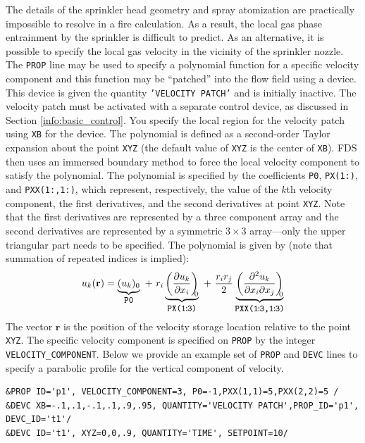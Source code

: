 \documentclass[11pt]{book}
\newcommand{\ct}{\tt\small}
\begin{document}
The details of the sprinkler head geometry and spray atomization are practically impossible to resolve in a fire calculation.  As a result, the local gas phase entrainment by the sprinkler is difficult to predict.  As an alternative, it is possible to specify the local gas velocity in the vicinity of the sprinkler nozzle.  The {\ct PROP} line may be used to specify a polynomial function for a specific velocity component and this function may be ``patched'' into the flow field using a device.  This device is given the quantity {\ct 'VELOCITY PATCH'} and is initially inactive.  The velocity patch must be activated with a separate control device, as discussed in Section \ref{info:basic_control}.  You specify the local region for the velocity patch using {\ct XB} for the device.  The polynomial is defined as a second-order Taylor expansion about the point {\ct XYZ} (the default value of {\ct XYZ} is the center of {\ct XB}).  FDS then uses an immersed boundary method to force the local velocity component to satisfy the polynomial.  The polynomial is specified by the coefficients {\ct P0}, {\ct PX(1\!:)}, and {\ct PXX(1\!:,1\!:)}, which represent, respectively, the value of the $k$th velocity component, the first derivatives, and the second derivatives at point {\ct XYZ}.  Note that the first derivatives are represented by a three component array and the second derivatives are represented by a symmetric $3 \times 3$ array---only the upper triangular part needs to be specified.  The polynomial is given by (note that summation of repeated indices is implied):
\begin{equation}
u_k(\mathbf{r}) = \underbrace{(u_k)_0}_{\mbox{\ct P0}} \,\,+\,\, r_i \underbrace{\left( \frac{\partial u_k}{\partial x_i} \right)_{\!\!\!0}}_{\mbox{\ct PX(1\!:\!3)}} \,\,+\,\,\frac{ r_i r_j}{2} \underbrace{\left(\frac{\partial^2 u_k}{\partial x_i \partial x_j}\right)_{\!\!\!0}}_{\mbox{\ct PXX(1\!:\!3,1\!:\!3)}}
\end{equation}
The vector $\mathbf{r}$ is the position of the velocity storage location relative to the point {\ct XYZ}.  The specific velocity component is specified on {\ct PROP} by the integer {\ct VELOCITY\_COMPONENT}.  Below we provide an example set of {\ct PROP} and {\ct DEVC} lines to specify a parabolic profile for the vertical component of velocity.

\footnotesize
\begin{verbatim}
&PROP ID='p1', VELOCITY_COMPONENT=3, P0=-1,PXX(1,1)=5,PXX(2,2)=5 /
&DEVC XB=-.1,.1,-.1,.1,.9,.95, QUANTITY='VELOCITY PATCH',PROP_ID='p1', DEVC_ID='t1'/
&DEVC ID='t1', XYZ=0,0,.9, QUANTITY='TIME', SETPOINT=10/
\end{verbatim}
\end{document}
